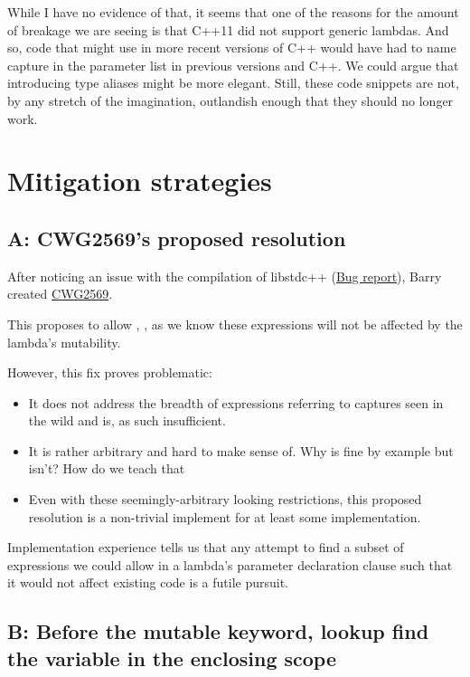 \documentclass{wg21}
\begin{document}
While I have no evidence of that, it seems that one of the reasons for the amount of breakage we are seeing is that C++11 did not support generic lambdas.
And so, code that might use  in more recent versions of C++ would have had to name capture in the parameter list in previous versions and C++.
We could argue that introducing type aliases might be more elegant. Still, these code snippets are not, by any stretch of the imagination, outlandish enough that they should no longer work.

\section{Mitigation strategies}

\subsection{A: CWG2569's proposed resolution}

After noticing an issue with the compilation of libstdc++ (\href{https://gcc.gnu.org/bugzilla/show_bug.cgi?id=105291}{Bug report}),
Barry created \href{https://cplusplus.github.io/CWG/issues/2569.html}{CWG2569}.

This proposes to allow , , 
as we know these expressions will not be affected by the lambda's mutability.

However, this fix proves problematic:
\begin{itemize}
    \item It does not address the breadth of expressions referring to captures seen in the wild and is, as such insufficient.
    \item It is rather arbitrary and hard to make sense of. Why is  fine by example but  isn't? How do we teach that
    \item Even with these seemingly-arbitrary looking restrictions, this proposed resolution is a non-trivial implement for at least some implementation.
\end{itemize}

Implementation experience tells us that any attempt to find a subset of expressions we could allow in a lambda's parameter declaration clause such that it would not affect existing code is a futile pursuit.

\subsection{B: Before the mutable keyword, lookup find the variable in the enclosing scope}
\end{document}

